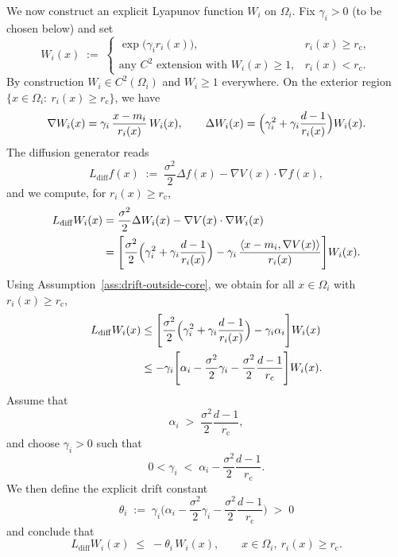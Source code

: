 We now construct an explicit Lyapunov function \(W_i\) on \(\Omega_i\).
Fix \(\gamma_i>0\) (to be chosen below) and set
\[
W_i(x)
\;:=\;
\begin{cases}
\exp\bigl(\gamma_i r_i(x)\bigr), & r_i(x)\ge r_{\mathrm c},\\[4pt]
\text{any $C^2$ extension with }W_i(x)\ge 1, & r_i(x)<r_{\mathrm c}.
\end{cases}
\]
By construction \(W_i\in C^2(\Omega_i)\) and \(W_i\ge 1\) everywhere.
On the exterior region \(\{x\in\Omega_i:\ r_i(x)\ge r_{\mathrm c}\}\), we have
\[
\nabla W_i(x)
=
\gamma_i\,\frac{x-m_i}{r_i(x)}\,W_i(x),
\qquad
\Delta W_i(x)
=
\Bigl(\gamma_i^2 + \gamma_i\frac{d-1}{r_i(x)}\Bigr)W_i(x).
\]
The diffusion generator reads
\[
L_{\mathrm{diff}} f(x)
\;:=\;
\frac{\sigma^2}{2}\Delta f(x) - \nabla V(x)\cdot\nabla f(x),
\]
and we compute, for \(r_i(x)\ge r_{\mathrm c}\),
\begin{align*}
L_{\mathrm{diff}} W_i(x)
&=
\frac{\sigma^2}{2}\Delta W_i(x) - \nabla V(x)\cdot\nabla W_i(x)\\
&=
\Biggl[
\frac{\sigma^2}{2}\Bigl(\gamma_i^2 + \gamma_i\frac{d-1}{r_i(x)}\Bigr)
- \gamma_i\,\frac{\langle x-m_i,\nabla V(x)\rangle}{r_i(x)}
\Biggr] W_i(x).
\end{align*}
Using Assumption~\ref{ass:drift-outside-core}, we obtain for all
\(x\in\Omega_i\) with \(r_i(x)\ge r_{\mathrm c}\),
\begin{align*}
L_{\mathrm{diff}} W_i(x)
&\le
\Biggl[
\frac{\sigma^2}{2}\Bigl(\gamma_i^2 + \gamma_i\frac{d-1}{r_i(x)}\Bigr)
- \gamma_i\alpha_i
\Biggr] W_i(x)\\
&\le
-\gamma_i
\Biggl[
\alpha_i
- \frac{\sigma^2}{2}\gamma_i
- \frac{\sigma^2}{2}\frac{d-1}{r_{\mathrm c}}
\Biggr] W_i(x).
\end{align*}
Assume that
\[
\alpha_i
\;>\;
\frac{\sigma^2}{2}\frac{d-1}{r_{\mathrm c}},
\]
and choose \(\gamma_i>0\) such that
\[
0<\gamma_i
\;<\;
\alpha_i
- \frac{\sigma^2}{2}\frac{d-1}{r_{\mathrm c}}.
\]
We then define the explicit drift constant
\begin{equation}\label{eq:theta-i-core-def}
\theta_i
\;:=\;
\gamma_i\Biggl(
\alpha_i
- \frac{\sigma^2}{2}\gamma_i
- \frac{\sigma^2}{2}\frac{d-1}{r_{\mathrm c}}
\Biggr)
\;>\;0
\end{equation}
and conclude that
\begin{equation}\label{eq:Lyap-outside-core}
L_{\mathrm{diff}} W_i(x)
\;\le\;
-\theta_i\,W_i(x),
\qquad
x\in\Omega_i,\ r_i(x)\ge r_{\mathrm c}.
\end{equation}

